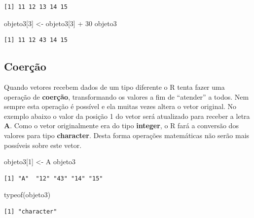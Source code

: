 \documentclass[
  letterpaper,
  DIV=11,
  numbers=noendperiod]{scrreprt}
\newenvironment{Shaded}{\begin{snugshade}}{\end{snugshade}}
\newcommand{\DecValTok}[1]{\textcolor[rgb]{0.68,0.00,0.00}{#1}}
\newcommand{\FunctionTok}[1]{\textcolor[rgb]{0.28,0.35,0.67}{#1}}
\newcommand{\NormalTok}[1]{\textcolor[rgb]{0.00,0.23,0.31}{#1}}
\newcommand{\OtherTok}[1]{\textcolor[rgb]{0.00,0.23,0.31}{#1}}
\newcommand{\SpecialCharTok}[1]{\textcolor[rgb]{0.37,0.37,0.37}{#1}}
\newcommand{\StringTok}[1]{\textcolor[rgb]{0.13,0.47,0.30}{#1}}
\begin{document}
\begin{verbatim}
[1] 11 12 13 14 15
\end{verbatim}

\begin{Shaded}
\begin{Highlighting}[]
\NormalTok{objeto3[}\DecValTok{3}\NormalTok{] }\OtherTok{\textless{}{-}}\NormalTok{ objeto3[}\DecValTok{3}\NormalTok{] }\SpecialCharTok{+} \DecValTok{30}
\NormalTok{objeto3}
\end{Highlighting}
\end{Shaded}

\begin{verbatim}
[1] 11 12 43 14 15
\end{verbatim}

\hypertarget{coeruxe7uxe3o}{%
\subsection{Coerção}\label{coeruxe7uxe3o}}

Quando vetores recebem dados de um tipo diferente o R tenta fazer uma
operação de \textbf{coerção}, transformando os valores a fim de
``atender'' a todos. Nem sempre esta operação é possível e ela muitas
vezes altera o vetor original. No exemplo abaixo o valor da posição 1 do
vetor será atualizado para receber a letra \textbf{A}. Como o vetor
originalmente era do tipo \textbf{integer}, o R fará a conversão dos
valores para tipo \textbf{character}. Desta forma operações matemáticas
não serão mais possíveis sobre este vetor.

\begin{Shaded}
\begin{Highlighting}[]
\NormalTok{objeto3[}\DecValTok{1}\NormalTok{] }\OtherTok{\textless{}{-}} \StringTok{\textquotesingle{}A\textquotesingle{}}
\NormalTok{objeto3}
\end{Highlighting}
\end{Shaded}

\begin{verbatim}
[1] "A"  "12" "43" "14" "15"
\end{verbatim}

\begin{Shaded}
\begin{Highlighting}[]
\FunctionTok{typeof}\NormalTok{(objeto3)}
\end{Highlighting}
\end{Shaded}

\begin{verbatim}
[1] "character"
\end{verbatim}
\end{document}

